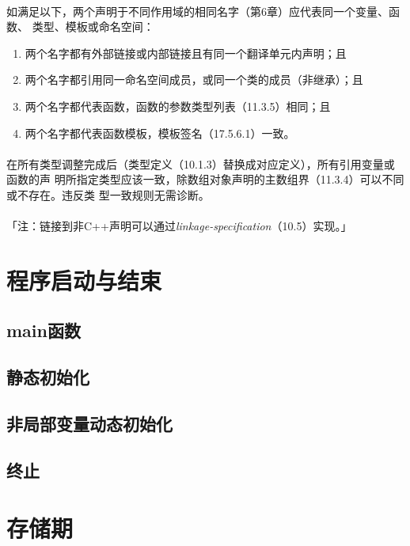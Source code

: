 \paragraph{}
如满足以下，两个声明于不同作用域的相同名字（第6章）应代表同一个变量、函数、
类型、模板或命名空间：
\begin{enumerate}
  \item{两个名字都有外部链接或内部链接且有同一个翻译单元内声明；且}
  \item{两个名字都引用同一命名空间成员，或同一个类的成员（非继承）；且}
  \item{两个名字都代表函数，函数的参数类型列表（11.3.5）相同；且}
  \item{两个名字都代表函数模板，模板签名（17.5.6.1）一致。}
\end{enumerate}

\paragraph{}
在所有类型调整完成后（类型定义（10.1.3）替换成对应定义），所有引用变量或函数的声
明所指定类型应该一致，除数组对象声明的主数组界（11.3.4）可以不同或不存在。违反类
型一致规则无需诊断。

\paragraph{}
「注：链接到非C++声明可以通过\textit{linkage-specification}（10.5）实现。」

\section{程序启动与结束}
\subsection{main函数}
\subsection{静态初始化}
\subsection{非局部变量动态初始化}
\subsection{终止}

\section{存储期}
